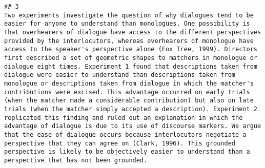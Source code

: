 \documentclass[
  english,
  man]{apa6}
\begin{document}
\begin{verbatim}
## 3                                                                                                                                                                                                                                                                                                                                                                                                                                                                                                                                                                                                                                                                                                                                                                                                                                                                                                                                                                                                                                                                                                                                                                                                                                                                                                                                                                                                                         Two experiments investigate the question of why dialogues tend to be easier for anyone to understand than monologues. One possibility is that overhearers of dialogue have access to the different perspectives provided by the interlocutors, whereas overhearers of monologue have access to the speaker's perspective alone (Fox Tree, 1999). Directors first described a set of geometric shapes to matchers in monologue or dialogue eight times. Experiment 1 found that descriptions taken from dialogue were easier to understand than descriptions taken from monologue or descriptions taken from dialogue in which the matcher's contributions were excised. This advantage occurred on early trials (when the matcher made a considerable contribution) but also on late trials (when the matcher simply accepted a description). Experiment 2 replicated this finding and ruled out an explanation in which the advantage of dialogue is due to its use of discourse markers. We argue that the ease of dialogue occurs because interlocutors negotiate a perspective that they can agree on (Clark, 1996). This grounded perspective is likely to be objectively easier to understand than a perspective that has not been grounded.

\end{verbatim}
\end{document}
